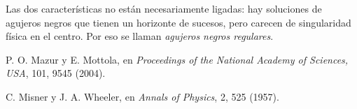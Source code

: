 \begin{description}[style=multiline,leftmargin=2em,labelwidth=1.5em]
\item[8.]\hypertarget{note:06-08}{}Las dos características no están necesariamente ligadas: hay soluciones de agujeros negros que tienen un horizonte de sucesos, pero carecen de singularidad física en el centro. Por eso se llaman \emph{agujeros negros regulares}.

\item[9.]\hypertarget{note:06-09}{}P. O. Mazur y E. Mottola, en \emph{Proceedings of the National Academy of Sciences, USA}, 101, 9545 (2004).

\item[10.]\hypertarget{note:06-10}{}C. Misner y J. A. Wheeler, en \emph{Annals of Physics}, 2, 525 (1957).

\end{description}
